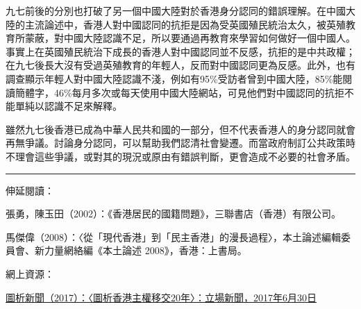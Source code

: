 九七前後的分別也打破了另一個中國大陸對於香港身分認同的錯誤理解。在中國大陸的主流論述中，香港人對中國認同的抗拒是因為受英國殖民統治太久，被英殖教育所蒙蔽，對中國大陸認識不足，所以要通過再教育來學習如何做好一個中國人。事實上在英國殖民統治下成長的香港人對中國認同並不反感，抗拒的是中共政權；在九七後長大沒有受過英殖教育的年輕人，反而對中國認同更為反感。此外，也有調查顯示年輕人對中國大陸認識不淺，例如有95\%受訪者曾到中國大陸，85\%能閱讀簡體字，46\%每月多次或每天使用中國大陸網站，可見他們對中國認同的抗拒不能單純以認識不足來解釋。

雖然九七後香港已成為中華人民共和國的一部分，但不代表香港人的身分認同就會再無爭議。討論身分認同，可以幫助我們認清社會變遷。而當政府制訂公共政策時不理會這些爭議，或對其的現況或原由有錯誤判斷，更會造成不必要的社會矛盾。

\rule[-10pt]{15cm}{0.05em}

伸延閱讀：

張勇，陳玉田（2002）：《香港居民的國籍問題》，三聯書店（香港）有限公司。

馬傑偉（2008）：〈從「現代香港」到「民主香港」的漫長過程〉，本土論述編輯委員會、新力量網絡編《本土論述 2008》，香港：上書局。

網上資源：

\href{https://thestandnews.com/politics/圖析香港主權移交20年/}{圖析新聞（2017）：〈圖析香港主權移交20年〉：立場新聞，2017年6月30日}